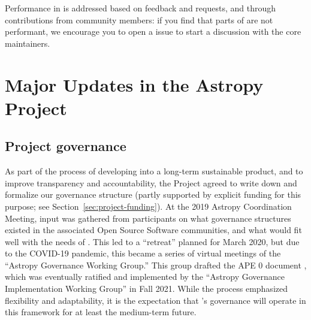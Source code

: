 \documentclass[modern]{aastex631}
\newcommand{\secauthor}[1]{{\color{blue}Author:~\textit{#1}}}
\begin{document}
Performance in \astropypkg is addressed based on feedback and requests, and
through contributions from community members: if you find that parts of
\astropypkg are not performant, we encourage you to open a \github issue to
start a discussion with the \astropypkg core maintainers.


\section{Major Updates in the Astropy Project} \label{sec:project-updates}

\subsection{Project governance} \label{sec:project-governance}



As part of the process of developing \astropypkg into a long-term sustainable
product, and to improve transparency and accountability, the Project agreed to
write down and formalize our governance structure (partly supported by explicit
funding for this purpose; see Section~\ref{sec:project-funding}). At the 2019
Astropy Coordination Meeting, input was gathered from participants on what governance
structures existed in the associated Open Source Software communities, and what
would fit well with the needs of \astropy. This led to a ``retreat'' planned
for March 2020, but due to the COVID-19 pandemic, this became a series of
virtual meetings of the ``Astropy Governance Working Group.'' This group
drafted the APE 0 document \citep{ape0}, which was eventually ratified and
implemented by the ``Astropy Governance Implementation Working Group'' in Fall
2021. While the process emphasized flexibility and adaptability,
it is the expectation that \astropy's governance will operate in
this framework for at least the medium-term future.
\end{document}
